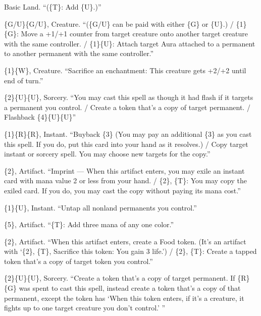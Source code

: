 \documentclass[11pt]{article}
\theoremstyle{definition}
\newcommand{\ms}[1]{\{#1\}}
\newcommand{\card}[1]{{\mdseries\scshape #1}}
\begin{document}
\begingroup\footnotesize
\begin{description}[leftmargin=1em,itemsep=1pt,parsep=0pt]
\item[\card{Island}] Basic Land. ``(\ms{T}: Add \ms{U}.)''
\item[\card{Simic Guildmage}] \ms{G/U}\ms{G/U}, Creature. ``(\ms{G/U} can be paid with either
  \ms{G} or \ms{U}.) / \ms{1}\ms{G}: Move a +1/+1 counter from target creature onto another
  target creature with the same controller. / \ms{1}\ms{U}: Attach target Aura attached to a
  permanent to another permanent with the same controller.''
\item[\card{Auratog}] \ms{1}\ms{W}, Creature. ``Sacrifice an enchantment: This creature gets
  +2/+2 until end of turn.''
\item[\card{Flash Photography}] \ms{2}\ms{U}\ms{U}, Sorcery. ``You may cast this spell as though
  it had flash if it targets a permanent you control. / Create a token that's a copy of
  target permanent. / Flashback \ms{4}\ms{U}\ms{U}''
\item[\card{Reiterate}] \ms{1}\ms{R}\ms{R}, Instant. ``Buyback \ms{3} (You may pay an
  additional \ms{3} as you cast this spell. If you do, put this card into your hand as it
  resolves.) / Copy target instant or sorcery spell. You may choose new targets for the
  copy.''
\item[\card{Isochron Scepter}] \ms{2}, Artifact. ``Imprint --- When this artifact enters, you
  may exile an instant card with mana value 2 or less from your hand. / \ms{2}, \ms{T}: You
  may copy the exiled card. If you do, you may cast the copy without paying its mana
  cost.''
\item[\card{Dramatic Reversal}] \ms{1}\ms{U}, Instant. ``Untap all nonland permanents you
  control.''
\item[\card{Gilded Lotus}] \ms{5}, Artifact. ``\ms{T}: Add three mana of any one color.''
\item[\card{Replicator}] \ms{2}, Artifact. ``When this artifact enters, create a Food token.
  (It's an artifact with `\ms{2}, \ms{T}, Sacrifice this token: You gain 3 life.') /
  \ms{2}, \ms{T}: Create a tapped token that's a copy of target token you control.''
\item[\card{Mythos of Illuna}] \ms{2}\ms{U}\ms{U}, Sorcery. ``Create a token that's a copy
  of target permanent. If \ms{R}\ms{G} was spent to cast this spell, instead create a token
  that's a copy of that permanent, except the token has `When this token enters, if it's a
  creature, it fights up to one target creature you don't control.' ''

\end{description}
\end{document}
